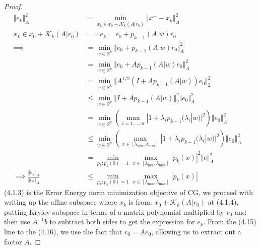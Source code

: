 \documentclass[]{article}
\theoremstyle{definition}
\begin{document}
        \begin{proof}
            \begin{align}
                \Vert e_k\Vert_A^2 & =
                \min_{x_k \in x_0 + \mathcal K_k(A|r_0)}
                \Vert 
                    x^+ - x_k
                \Vert_A^2
                \\
                x_k \in x_0 + \mathcal K_k(A|r_0) 
                & \implies
                e_k = e_0 + p_{k - 1}(A|w)r_0
                \\
                \implies  &=
                \min_{w\in \mathbb R^k}
                \Vert 
                    e_0 + p_{k - 1}(A|w)r_0
                \Vert_A^2
                \\
                &= \min_{w\in \mathbb R^k}
                \Vert 
                    e_0 + Ap_{k - 1}(A|w)e_0
                \Vert_A^2
                \\
                &= \min_{w\in \mathbb R^k}
                \Vert 
                    A^{1/2}(I + Ap_{k - 1}(A|w))e_0
                \Vert_2^2
                \\
                &\le
                \min_{w\in \mathbb R^k}
                \Vert 
                    I + Ap_{k - 1}(A|w)
                \Vert_2^2\Vert e_0\Vert_A^2 \quad 
                \\
                & = 
                \min_{w\in \mathbb R^k}
                \left(
                    \max_{i = 1, \dots, n}
                    |1 + \lambda_i p_{k - 1}(\lambda_i|w)|^2
                \right)\Vert e_0\Vert_A^2
                \quad
                \\
                & \le 
                \min_{w\in \mathbb R^k}
                \left(
                    \max_{x\in [\lambda_{\min}, \lambda_{\max}]}
                    |1 + \lambda_i p_{k - 1}(\lambda_i|w)|^2
                \right)\Vert e_0\Vert_A^2
                \quad 
                \\
                &= 
                \min_{p_{k}: p_{k}(0) = 1}
                \max_{x\in [\lambda_{\min}, \lambda_{\max}]}
                | p_{k}(x)|^2 \Vert e\Vert_A^2
                \\
                \implies
                \frac{\Vert e_k\Vert_A}{\Vert e_0\Vert_A} &\le 
                \min_{p_{k}: p_{k}(0) = 1}\max_{x\in [\lambda_{\text{min}}, \lambda_{\text{max}}]} |p_{k}(x)|
            \end{align}
            (4.1.3) is the Error Energy norm minimization objective of CG, we proceed with writing up the affine subspace where $x_k$ is from: $x_0 + \mathcal K_k(A|r_0)$ at (4.1.4), putting Krylov subspace in terms of a matrix polynomial multiplied by $r_0$ and then use $A^{-1}b$ to subtract both sides to get the expression for $e_k$. From the (4.15) line to the (4.16), we use the fact that $r_0 = Ae_0$, allowing us to extract out a factor $A$. 

\end{proof}
\end{document}
